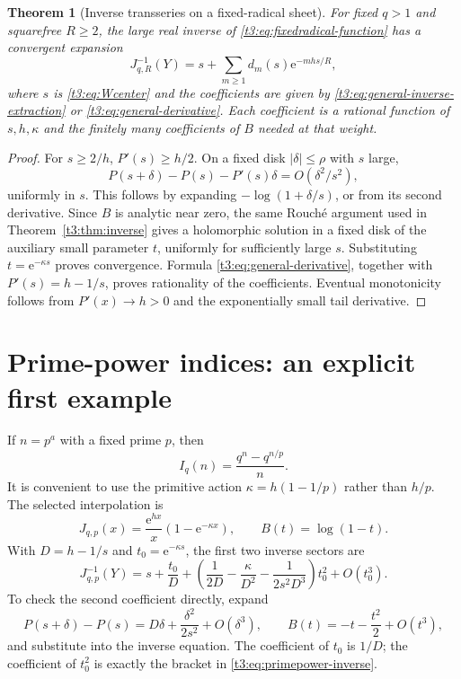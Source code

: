 \documentclass[11pt,openany]{book}
\numberwithin{equation}{chapter}
\theoremstyle{plain}
\newtheorem{theorem}{Theorem}[chapter]
\theoremstyle{definition}
\theoremstyle{remark}
\newcommand{\ee}{\mathrm e}
\begin{document}
\begin{theorem}[Inverse transseries on a fixed-radical sheet]\label{t3:thm:radical-inverse}
For fixed $q>1$ and squarefree $R\ge2$, the large real inverse of \eqref{t3:eq:fixedradical-function} has a convergent expansion
\begin{equation}\label{t3:eq:radical-inverse}
 J_{q,R}^{-1}(Y)=s+\sum_{m\ge1}d_m(s)\ee^{-mhs/R},
\end{equation}
where $s$ is \eqref{t3:eq:Wcenter} and the coefficients are given by
\eqref{t3:eq:general-inverse-extraction} or \eqref{t3:eq:general-derivative}. Each coefficient is a rational function of $s,h,\kappa$ and the finitely many coefficients of $B$ needed at that weight.
\end{theorem}
\begin{proof}
For $s\ge2/h$, $P'(s)\ge h/2$. On a fixed disk $|\delta|\le\rho$ with $s$ large,
\[
 P(s+\delta)-P(s)-P'(s)\delta=O(\delta^2/s^2),
\]
uniformly in $s$. This follows by expanding $-\log(1+\delta/s)$, or from its second derivative. Since $B$ is analytic near zero, the same Rouch\'e argument used in Theorem~\ref{t3:thm:inverse} gives a holomorphic solution in a fixed disk of the auxiliary small parameter $t$, uniformly for sufficiently large $s$. Substituting $t=\ee^{-\kappa s}$ proves convergence. Formula \eqref{t3:eq:general-derivative}, together with $P'(s)=h-1/s$, proves rationality of the coefficients. Eventual monotonicity follows from $P'(x)\to h>0$ and the exponentially small tail derivative.
\end{proof}

\section{Prime-power indices: an explicit first example}

If $n=p^a$ with a fixed prime $p$, then
\[
 I_q(n)=\frac{q^n-q^{n/p}}n.
\]
It is convenient to use the primitive action
$\kappa=h(1-1/p)$ rather than $h/p$. The selected interpolation is
\begin{equation}\label{t3:eq:primepower-interp}
 J_{q,p}(x)=\frac{\ee^{hx}}x(1-\ee^{-\kappa x}),
 \qquad B(t)=\log(1-t).
\end{equation}
With $D=h-1/s$ and $t_0=\ee^{-\kappa s}$, the first two inverse sectors are
\begin{equation}\label{t3:eq:primepower-inverse}
 \boxed{\displaystyle
 J_{q,p}^{-1}(Y)=s+\frac{t_0}{D}
 +\left(\frac1{2D}-\frac{\kappa}{D^2}
              -\frac1{2s^2D^3}\right)t_0^2+O(t_0^3).}
\end{equation}
To check the second coefficient directly, expand
\[
 P(s+\delta)-P(s)=D\delta+\frac{\delta^2}{2s^2}+O(\delta^3),
 \qquad B(t)=-t-\frac{t^2}{2}+O(t^3),
\]
and substitute into the inverse equation. The coefficient of $t_0$ is $1/D$; the coefficient of $t_0^2$ is exactly the bracket in \eqref{t3:eq:primepower-inverse}.
\end{document}
